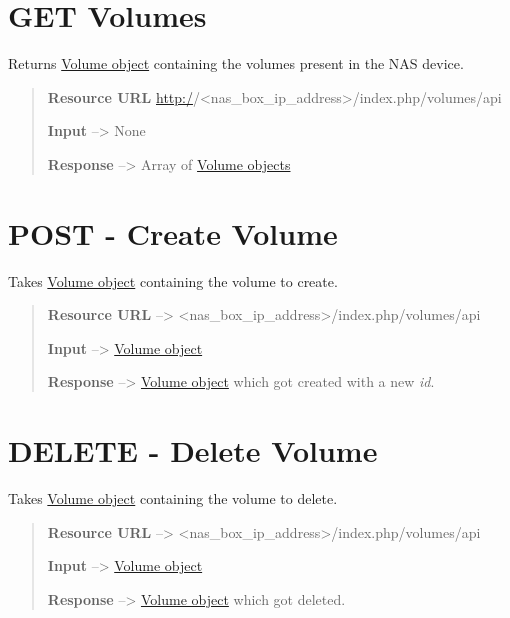\documentclass[letterpaper,10pt,english]{sphinxmanual}
\begin{document}
\section{GET Volumes}
\label{volumes:get-volumes}
Returns {\hyperref[volumes:volume-object-label]{Volume object}} containing the volumes present
in the NAS device.
\begin{quote}

\textbf{Resource URL} \href{http:/}{http:/}/\textless{}nas\_box\_ip\_address\textgreater{}/index.php/volumes/api

\textbf{Input} --\textgreater{} None

\textbf{Response} --\textgreater{} Array of {\hyperref[volumes:volume-object-label]{Volume objects}}
\end{quote}


\section{POST - Create Volume}
\label{volumes:post-create-volume}
Takes {\hyperref[volumes:volume-object-label]{Volume object}} containing the volume to create.
\begin{quote}

\textbf{Resource URL} --\textgreater{} \textless{}nas\_box\_ip\_address\textgreater{}/index.php/volumes/api

\textbf{Input} --\textgreater{} {\hyperref[volumes:volume-object-label]{Volume object}}

\textbf{Response} --\textgreater{} {\hyperref[volumes:volume-object-label]{Volume object}} which got created with a new \emph{id}.
\end{quote}


\section{DELETE - Delete Volume}
\label{volumes:delete-delete-volume}
Takes {\hyperref[volumes:volume-object-label]{Volume object}} containing the volume to delete.
\begin{quote}

\textbf{Resource URL} --\textgreater{} \textless{}nas\_box\_ip\_address\textgreater{}/index.php/volumes/api

\textbf{Input} --\textgreater{} {\hyperref[volumes:volume-object-label]{Volume object}}

\textbf{Response} --\textgreater{} {\hyperref[volumes:volume-object-label]{Volume object}} which got deleted.
\end{quote}
\end{document}
